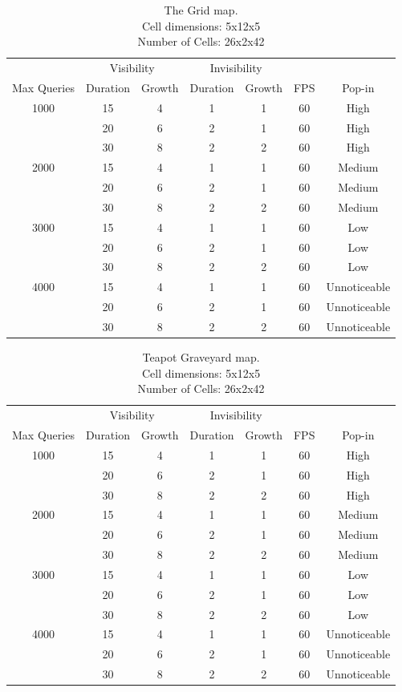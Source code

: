 \documentclass[12pt]{ucthesis}
\newcommand{\captionfonts}{\small\bf\ssp}
\begin{document}
\begin{table}
\begin{center}
\begin{tabular}{|c|c|c|c|c|c|c|}
\hline 
&\multicolumn{2}{c|}{Visibility}&\multicolumn{2}{c|}{Invisibility}&&
\tabularnewline
Max Queries&Duration&Growth&Duration&Growth&FPS&Pop-in
\tabularnewline
\hline
1000 & 15& 4& 1& 1& 60& High
\tabularnewline
& 20& 6& 2& 1& 60& High
\tabularnewline
& 30& 8& 2& 2& 60& High
\tabularnewline \hline
2000 & 15& 4& 1& 1& 60& Medium
\tabularnewline
& 20& 6& 2& 1& 60& Medium
\tabularnewline
& 30& 8& 2& 2& 60& Medium
\tabularnewline \hline
3000 & 15& 4& 1& 1& 60& Low
\tabularnewline
& 20& 6& 2& 1& 60& Low
\tabularnewline
& 30& 8& 2& 2& 60& Low
\tabularnewline \hline 
4000 & 15& 4& 1& 1& 60& Unnoticeable
\tabularnewline 
& 20& 6& 2& 1& 60& Unnoticeable
\tabularnewline
& 30& 8& 2& 2& 60& Unnoticeable
\tabularnewline \hline 
\end{tabular}
\captionfonts
\caption[Performance for The Grid]{The Grid map.\\Cell dimensions: 5x12x5\\Number of Cells: 26x2x42}
\label{table:the-grid-performance-c}
\end{center}
\end{table}

\begin{table}
\begin{center}
\begin{tabular}{|c|c|c|c|c|c|c|}
\hline 
&\multicolumn{2}{c|}{Visibility}&\multicolumn{2}{c|}{Invisibility}&&
\tabularnewline
Max Queries&Duration&Growth&Duration&Growth&FPS&Pop-in
\tabularnewline
\hline
1000 & 15& 4& 1& 1& 60& High
\tabularnewline
& 20& 6& 2& 1& 60& High
\tabularnewline
& 30& 8& 2& 2& 60& High
\tabularnewline \hline
2000 & 15& 4& 1& 1& 60& Medium
\tabularnewline
& 20& 6& 2& 1& 60& Medium
\tabularnewline
& 30& 8& 2& 2& 60& Medium
\tabularnewline \hline
3000 & 15& 4& 1& 1& 60& Low
\tabularnewline
& 20& 6& 2& 1& 60& Low
\tabularnewline
& 30& 8& 2& 2& 60& Low
\tabularnewline \hline 
4000 & 15& 4& 1& 1& 60& Unnoticeable
\tabularnewline 
& 20& 6& 2& 1& 60& Unnoticeable
\tabularnewline
& 30& 8& 2& 2& 60& Unnoticeable
\tabularnewline \hline 
\end{tabular}
\captionfonts
\caption[Performance for Teapot Graveyard]{Teapot Graveyard map.\\Cell dimensions: 5x12x5\\Number of Cells: 26x2x42}
\label{table:teapot-performance-a}
\end{center}
\end{table}
\end{document}
